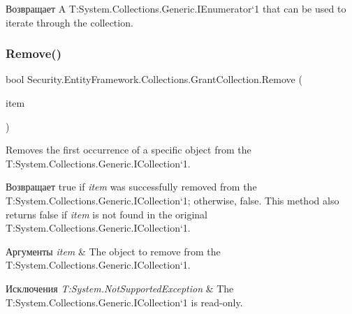\begin{DoxyReturn}{Возвращает}
A T\+:\+System.\+Collections.\+Generic.\+I\+Enumerator`1 that can be used to iterate through the collection. 
\end{DoxyReturn}
\mbox{\label{class_security_1_1_entity_framework_1_1_collections_1_1_grant_collection_a95e929659c16750c32fdd468d319f311}} 
\subsubsection{\texorpdfstring{Remove()}{Remove()}\hspace{0.1cm}{\footnotesize\ttfamily [1/3]}}
{\footnotesize\ttfamily bool Security.\+Entity\+Framework.\+Collections.\+Grant\+Collection.\+Remove (\begin{DoxyParamCaption}\item[{\hyperlink{interface_security_1_1_interfaces_1_1_model_1_1_i_grant}{I\+Grant}}]{item }\end{DoxyParamCaption})}



Removes the first occurrence of a specific object from the T\+:\+System.\+Collections.\+Generic.\+I\+Collection`1. 

\begin{DoxyReturn}{Возвращает}
true if {\itshape item}  was successfully removed from the T\+:\+System.\+Collections.\+Generic.\+I\+Collection`1; otherwise, false. This method also returns false if {\itshape item}  is not found in the original T\+:\+System.\+Collections.\+Generic.\+I\+Collection`1. 
\end{DoxyReturn}

\begin{DoxyParams}{Аргументы}
{\em item} & The object to remove from the T\+:\+System.\+Collections.\+Generic.\+I\+Collection`1.\\
\hline
\end{DoxyParams}

\begin{DoxyExceptions}{Исключения}
{\em T\+:\+System.\+Not\+Supported\+Exception} & The T\+:\+System.\+Collections.\+Generic.\+I\+Collection`1 is read-\/only.\\
\hline
\end{DoxyExceptions}
\mbox{\label{class_security_1_1_entity_framework_1_1_collections_1_1_grant_collection_a22e80b37be968a99e10b00c8b67f2172}} 

